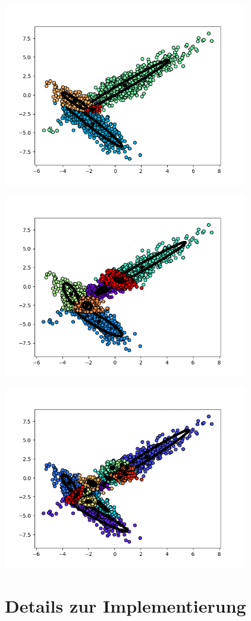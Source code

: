 \includegraphics[height=8cm]{./plots/plot_for_k_5.png}

\includegraphics[height=8cm]{./plots/plot_for_k_6.png}

\includegraphics[height=8cm]{./plots/plot_for_k_20.png}


\section*{Details zur Implementierung}

